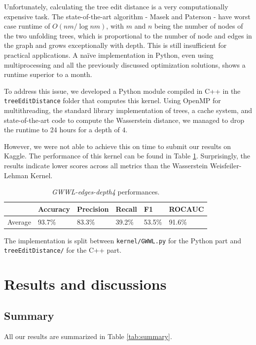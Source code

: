 \documentclass{IEEEtran}
\begin{document}
Unfortunately, calculating the tree edit distance is a very computationally expensive task.
The state-of-the-art algorithm - Masek and Paterson \cite{masek1980faster}- have worst case runtime of $O(nm/ \log nm)$,
with $m$ and $n$ being the number of nodes of the two unfolding trees,
which is proportional to the number of node and edges in the graph and grows exceptionally with depth.
This is still insufficient for practical applications.
A naïve implementation in Python,
even using multiprocessing and all the previously discussed optimization solutions, shows a runtime superior to a month.

To address this issue, we developed a Python module compiled in C++ in the \texttt{treeEditDistance} folder that computes this kernel. Using OpenMP for multithreading, the standard library implementation of trees, a cache system, and state-of-the-art code to compute the Wasserstein distance, we managed to drop the runtime to 24 hours for a depth of $4$.

However, we were not able to achieve this on time to submit our results on Kaggle.
The performance of this kernel can be found in Table \ref{tab:gwwl}.
Surprisingly, the results indicate lower scores across all metrics than the Wasserstein Weisfeiler-Lehman Kernel.

\begin{table}[h]
    \centering
    \begin{tabular}{l|llll|l}
                & Accuracy & Precision & Recall & F1     & ROCAUC \\
        \hline
        Average & 93.7\%   & 83.3\%    & 39.2\% & 53.5\% & 91.6\% \\
    \end{tabular}
    \caption{\emph{GWWL-edges-depth4} performances.}
    \label{tab:gwwl}
\end{table}

The implementation is split between \texttt{kernel/GWWL.py} for the Python part and \texttt{treeEditDistance/} for the C++ part.

\section{Results and discussions}

\subsection{Summary}
All our results are summarized in Table \ref{tab:summary}.
\end{document}
